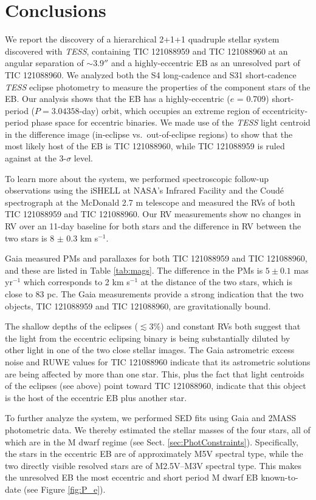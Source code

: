 \documentclass[fleqn,usenatbib]{mnras} %
\newcommand{\kms}{km s$^{-1}$}
\begin{document}
\section{Conclusions}

We report the discovery of a hierarchical 2+1+1 quadruple stellar system discovered with {\em TESS}, containing TIC 121088959 and TIC 121088960 at an angular separation of $\sim$3.9$''$ and a highly-eccentric EB as an unresolved part of TIC 121088960. We analyzed both the S4 long-cadence and S31 short-cadence {\em TESS} eclipse photometry to measure the properties of the component stars of the EB. Our analysis shows that the EB has a highly-eccentric ($e$ = 0.709) short-period ($P = 3.04358$-day) orbit, which occupies an extreme region of eccentricity-period phase space for eccentric binaries.  We made use of the {\em TESS} light centroid in the difference image (in-eclipse vs.~out-of-eclipse regions) to show that the most likely host of the EB is TIC 121088960, while TIC 121088959 is ruled against at the 3-$\sigma$ level.

\indent To learn more about the system, we performed spectroscopic follow-up observations using the iSHELL at NASA's Infrared Facility and the Coud{\'e} spectrograph at the McDonald 2.7 m telescope and measured the RVs of both TIC 121088959 and TIC 121088960. Our RV measurements show no changes in RV over an 11-day baseline for both stars and the difference in RV between the two stars is 8 $\pm$ 0.3 \kms.

Gaia measured PMs and parallaxes for both TIC 121088959 and TIC 121088960, and these are listed in Table \ref{tab:mags}. The difference in the PMs is $5 \pm 0.1$ mas yr$^{-1}$ which corresponds to 2 km s$^{-1}$ at the distance of the two stars, which is close to 83 pc. The Gaia measurements provide a strong indication that the two objects, TIC 121088959 and TIC 121088960, are gravitationally bound.

The shallow depths of the eclipses ($\lesssim 3\%$) and constant RVs both suggest that the light from the eccentric eclipsing binary is being substantially diluted by other light in one of the two close stellar images.  The Gaia astrometric excess noise and RUWE values for TIC 121088960 indicate that its astrometric solutions are being affected by more than one star.  This, plus the fact that light centroids of the eclipses (see above) point toward TIC 121088960, indicate that this object is the host of the eccentric EB plus another star.

To further analyze the system, we performed SED fits using Gaia and 2MASS photometric data.  We thereby estimated the stellar masses of the four stars, all of which are in the M dwarf regime (see Sect. \ref{sec:PhotConstraints}). Specifically, the stars in the eccentric EB are of approximately M5V spectral type, while the two directly visible resolved stars are of M2.5V--M3V spectral type.  This makes the unresolved EB the most eccentric and short period M dwarf EB known-to-date (see Figure \ref{fig:P_e}).
\end{document}
